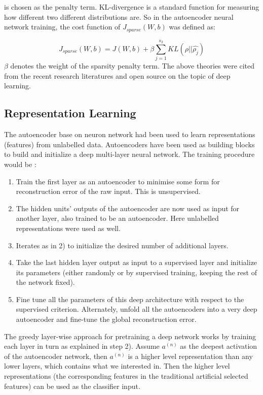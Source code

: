 \documentclass{bmcart}
\begin{document}
\noindent is chosen as the  penalty term. KL-divergence is a standard function for measuring how different two different distributions are. So in the autoencoder neural network training, the cost function of $J_{sparse}(W,b)$ was defined as:

\begin{equation}
J_{sparse}(W,b) = J(W,b) + \beta \sum_{j=1}^{s_2}KL(\rho||\hat{\rho_j})
\end{equation}
\noindent $\beta$ denotes the weight of the sparsity penalty term.
The above theories were cited from the recent research literatures \cite{zou2012deep} and open source \cite{ufldl} on the topic of deep learning.

\subsection*{Representation Learning}
The autoencoder base on neuron network had been used to learn representations (features) from unlabelled data. Autoencoders have been used as building blocks to build and initialize a deep multi-layer neural network. The training procedure would be \cite{bengio2009learning}:
\begin{enumerate}
\item Train the first layer as an autoencoder to minimise some form for reconstruction error of the raw input. This is unsupervised.
\item The hidden units' outputs of the autoencoder are now used as input for another layer, also trained to be an autoencoder. Here unlabelled representations were used as well.
\item Iterates as in 2) to initialize the desired number of additional layers.
\item Take the last hidden layer output as input to a supervised layer and initialize its parameters (either randomly or by supervised training, keeping the rest of the network fixed).
\item Fine tune all the parameters of this deep architecture with respect to the supervised criterion. Alternately, unfold all the autoencoders into a very deep autoencoder and fine-tune the global reconstruction error.
\end{enumerate}
The greedy layer-wise approach for pretraining a deep network works by training each layer in turn as explained in step 2). Assume $a^{(n)}$ as the deepest activation of the autoencoder network, then $a^{(n)}$ is a higher level representation than any lower layers, which contains what we interested in. Then the higher level representations (the corresponding features in the traditional artificial selected features) can be used as the classifier input.
\end{document}
